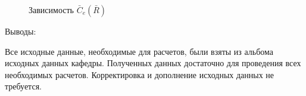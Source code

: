 \begin{figure}[H]
    \caption{Зависимость $\bar{C}_{e}(\bar{R})$}
    \label{fig:Ce}
\end{figure}

\begin{center}
    Выводы:
\end{center}

Все исходные данные, необходимые для расчетов, были взяты из
альбома исходных данных кафедры. Полученных данных достаточно для проведения всех необходимых расчетов. Корректировка и дополнение исходных данных не требуется.

